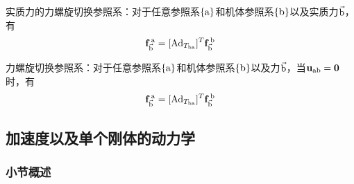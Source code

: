 \documentclass[12pt, a4paper, article, UTF8]{ctexart}
\begin{document}
\begin{mytheorem}
实质力的力螺旋切换参照系：对于任意参照系$\{\textnormal{a}\}$和机体参照系$\{\textnormal{b}\}$以及实质力$\vec{\textnormal{b}}$，有
\begin{align*}
\mathbf{f}_{\vec{\textnormal{b}}}^{\,\textnormal{a}} = [\textnormal{Ad}_{T_\textnormal{ba}}]^T \mathbf{f}_{\vec{\textnormal{b}}}^{\,\textnormal{b}}
\end{align*}
\end{mytheorem}

\begin{mytheorem}
力螺旋切换参照系：对于任意参照系$\{\textnormal{a}\}$和机体参照系$\{\textnormal{b}\}$以及力$\vec{\textnormal{b}}$，当$\mathbf{u}_\textnormal{ab}=\mathbf{0}$时，有
\begin{align*}
\mathbf{f}_{\vec{\textnormal{b}}}^{\,\textnormal{a}} = [\textnormal{Ad}_{T_\textnormal{ba}}]^T \mathbf{f}_{\vec{\textnormal{b}}}^{\,\textnormal{b}}
\end{align*}
\end{mytheorem}



\subsection{加速度以及单个刚体的动力学}
\subsubsection{小节概述}
\end{document}
